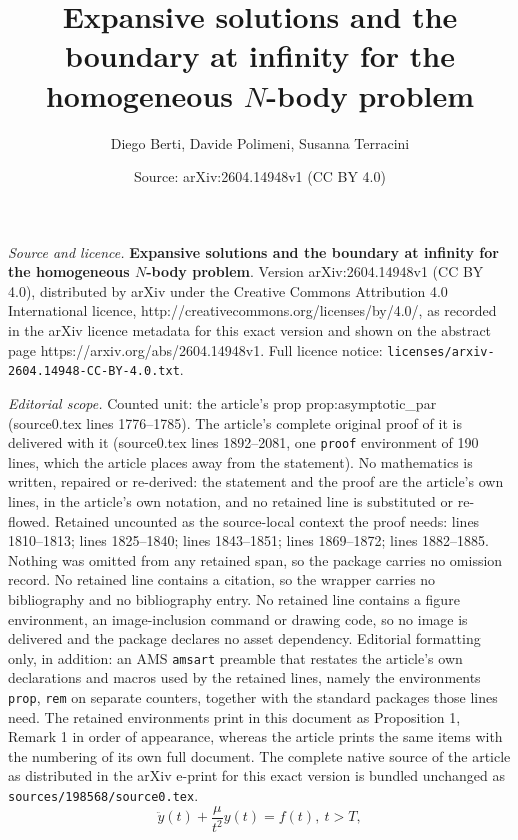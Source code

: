 \documentclass[10pt,a4paper]{amsart}
\title{\textbf{Expansive solutions and the boundary at infinity for the homogeneous $N$-body problem}}
\author{Diego Berti, Davide Polimeni, Susanna Terracini}
\date{Source: arXiv:2604.14948v1 (CC BY 4.0)}
\begin{document}
\maketitle

\noindent\emph{Source and licence.} \textbf{Expansive solutions and the boundary at infinity for the homogeneous $N$-body problem}. Version arXiv:2604.14948v1 (CC BY 4.0), distributed by arXiv under the Creative Commons Attribution 4.0 International licence, http://creativecommons.org/licenses/by/4.0/, as recorded in the arXiv licence metadata for this exact version and shown on the abstract page https://arxiv.org/abs/2604.14948v1. Full licence notice: \texttt{licenses/arxiv-2604.14948-CC-BY-4.0.txt}.\par\smallskip

\noindent\textit{Editorial scope.} Counted unit: the article's prop prop:asymptotic\_par (source0.tex lines 1776--1785). The article's complete original proof of it is delivered with it (source0.tex lines 1892--2081, one \texttt{proof} environment of 190 lines, which the article places away from the statement). No mathematics is written, repaired or re-derived: the statement and the proof are the article's own lines, in the article's own notation, and no retained line is substituted or re-flowed.  Retained uncounted as the source-local context the proof needs: lines 1810--1813; lines 1825--1840; lines 1843--1851; lines 1869--1872; lines 1882--1885.  Nothing was omitted from any retained span, so the package carries no omission record.  No retained line contains a citation, so the wrapper carries no bibliography and no bibliography entry.  No retained line contains a figure environment, an image-inclusion command or drawing code, so no image is delivered and the package declares no asset dependency.  Editorial formatting only, in addition: an AMS \texttt{amsart} preamble that restates the article's own declarations and macros used by the retained lines, namely the environments \texttt{prop}, \texttt{rem} on separate counters, together with the standard packages those lines need.  The retained environments print in this document as Proposition 1, Remark 1 in order of appearance, whereas the article prints the same items with the numbering of its own full document.  The complete native source of the article as distributed in the arXiv e-print for this exact version is bundled unchanged as \texttt{sources/198568/source0.tex}.
\begin{equation}
\label{eq:mu_f}
\ddot{y}(t) + \frac{\mu}{t^2}y(t) = f(t), \ t> T,
\end{equation}
\end{document}
